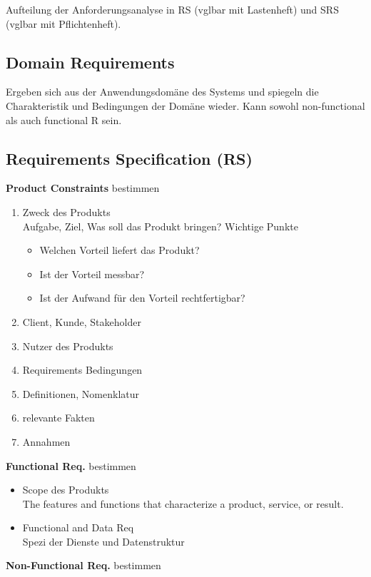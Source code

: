 Aufteilung der Anforderungsanalyse in RS (vglbar mit Lastenheft) und SRS (vglbar mit Pflichtenheft).

\subsection{Domain Requirements}
Ergeben sich aus der Anwendungsdomäne des Systems und spiegeln die Charakteristik und Bedingungen der Domäne wieder. Kann sowohl non-functional als auch functional R sein.

\subsection{Requirements Specification (RS)}
\textbf{Product Constraints} bestimmen
\begin{enumerate}
	\item Zweck des Produkts\\
	Aufgabe, Ziel, Was soll das Produkt bringen? Wichtige Punkte
	\begin{itemize}
		\item Welchen Vorteil liefert das Produkt?
		\item Ist der Vorteil messbar?
		\item Ist der Aufwand für den Vorteil rechtfertigbar?
	\end{itemize}
	\item Client, Kunde, Stakeholder
	\item Nutzer des Produkts
	\item Requirements Bedingungen
	\item Definitionen, Nomenklatur
	\item relevante Fakten
	\item Annahmen
\end{enumerate}
\textbf{Functional Req.} bestimmen
\begin{itemize}
	\item Scope des Produkts\\
	The features and functions that characterize a product, service, or result.
	\item Functional and Data Req\\
	Spezi der Dienste und Datenstruktur
\end{itemize}
\textbf{Non-Functional Req.} bestimmen

